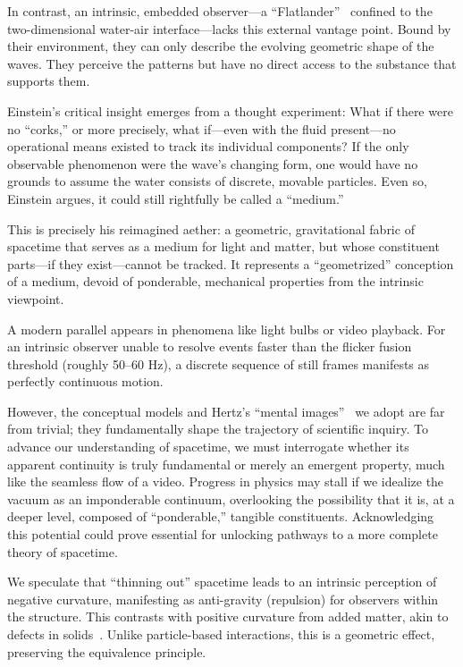 \documentclass[%
  reprint,
  superscriptaddress,
  showpacs,
  showkeys,
  amsmath,amssymb,
  pra,
  longbibliography,
  floatfix,
]{revtex4-2}
\begin{document}
In contrast, an intrinsic, embedded observer---a ``Flatlander''~\cite{abbott-flatland} confined to the two-dimensional water-air interface---lacks this external vantage point. Bound by their environment, they can only describe the evolving geometric shape of the waves. They perceive the patterns but have no direct access to the substance that supports them.

Einstein's critical insight emerges from a thought experiment: What if there were no ``corks,'' or more precisely, what if---even with the fluid present---no operational means existed to track its individual components? If the only observable phenomenon were the wave's changing form, one would have no grounds to assume the water consists of discrete, movable particles. Even so, Einstein argues, it could still rightfully be called a ``medium.''

This is precisely his reimagined aether: a geometric, gravitational fabric of spacetime that serves as a medium for light and matter, but whose constituent parts---if they exist---cannot be tracked. It represents a ``geometrized'' conception of a medium, devoid of ponderable, mechanical properties from the intrinsic viewpoint.

A modern parallel appears in phenomena like light bulbs or video playback. For an intrinsic observer unable to resolve events faster than the flicker fusion threshold (roughly 50--60 Hz), a discrete sequence of still frames manifests as perfectly continuous motion.

However, the conceptual models and Hertz's ``mental images''~\cite{hertz-94e} we adopt are far from trivial; they fundamentally shape the trajectory of scientific inquiry. To advance our understanding of spacetime, we must interrogate whether its apparent continuity is truly fundamental or merely an emergent property, much like the seamless flow of a video. Progress in physics may stall if we idealize the vacuum as an imponderable continuum, overlooking the possibility that it is, at a deeper level, composed of ``ponderable,'' tangible constituents. Acknowledging this potential could prove essential for unlocking pathways to a more complete theory of spacetime.

We speculate that ``thinning out'' spacetime leads to an intrinsic perception of negative curvature, manifesting as anti-gravity (repulsion) for observers within the structure. This contrasts with positive curvature from added matter, akin to defects in solids~\cite{Kroner-1958,kroner-1990}. Unlike particle-based interactions, this is a geometric effect, preserving the equivalence principle.
\end{document}

